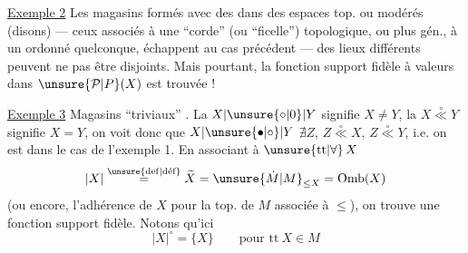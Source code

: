 
\uline{Exemple 2} Les magasins formés avec des   dans des espaces  top. ou modérés (disons) ---  ceux associés à une ``corde'' (ou ``ficelle'') topologique, ou plus gén., à un  ordonné quelconque, échappent au cas précédent --- des lieux différents peuvent ne pas être disjoints. Mais pourtant, la fonction support fidèle à valeurs dans $\unsure{\mathcal{P}|P}(X)$ est  trouvée !

\uline{Exemple 3} Magasins ``triviaux''  . La   $X\lvert\unsure{\circ|0}\rvert Y$ signifie $X\ne Y$, la   $X\overset{\circ}{\ll}Y$ signifie $X=Y$, on voit  donc que $X\lvert\unsure{\bullet|\circ}\rvert Y$  $\nexists Z$, $Z\overset{\circ}{\ll}X$, $Z\overset{\circ}{\ll}Y$, i.e. on est dans le cas de l'exemple 1. En associant à $\unsure{\text{tt}|\forall}\,X$
\[
 \lvert X\rvert\overset{\unsure{\mathrm{def}|\text{déf}}}{=}\widetilde{X}=\unsure{\dot M|M}_{\leq X}=\mathrm{Omb}(X)
\]
(ou encore, l'adhérence de $X$ pour la top. de $M$ associée à $\leq$), on trouve une fonction support fidèle. Notons qu'ici
\[
 \lvert X\rvert^{\circ}=\{X\} \qquad \text{pour tt}\ X\in M
\]

